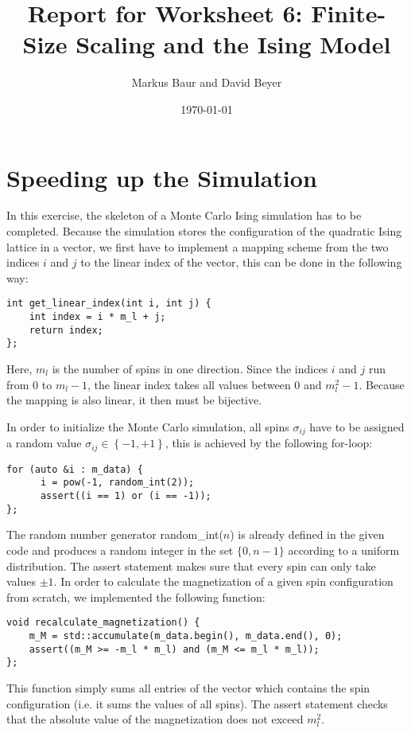 \documentclass[a4paper,10pt,bibtotoc]{scrartcl}
\begin{document}
\titlehead{Simulation Methods in Physics I \hfill WS 2019/2010}
\title{Report for Worksheet 6: Finite-Size Scaling and the Ising Model}
\author{Markus Baur and David Beyer}
\date{\today}
\maketitle

\tableofcontents

\section{Speeding up the Simulation}
In this exercise, the skeleton of a Monte Carlo Ising simulation has to be completed. 
Because the simulation stores the configuration of the quadratic Ising lattice in a vector, we first have to implement a mapping scheme from the two indices $i$ and $j$ to the linear index of the vector, this can be done in the following way:
\begin{lstlisting}
int get_linear_index(int i, int j) {
    int index = i * m_l + j;
    return index;
};
\end{lstlisting}
Here, $m_l$ is the number of spins in one direction. 
Since the indices $i$ and $j$ run from $0$ to $m_l-1$, the linear index takes all values between $0$ and $m_l^2 -1$. 
Because the mapping is also linear, it then must be bijective.

In order to initialize the Monte Carlo simulation, all spins $\sigma_{ij}$ have to be assigned a random value $\sigma_{ij}\in\left\{-1,+1\right\}$, this is achieved by the following for-loop:
\begin{lstlisting}
for (auto &i : m_data) {
      i = pow(-1, random_int(2));
      assert((i == 1) or (i == -1));
};
\end{lstlisting}
The random number generator random\_int($n$) is already defined in the given code and produces a random integer in the set $\{0,n-1\}$ according to a uniform distribution.
The assert statement makes sure that every spin can only take values $\pm 1$.
\newpage
\noindent In order to calculate the magnetization of a given spin configuration from scratch, we implemented the following function:
\begin{lstlisting}
void recalculate_magnetization() {
    m_M = std::accumulate(m_data.begin(), m_data.end(), 0);
    assert((m_M >= -m_l * m_l) and (m_M <= m_l * m_l));
};
\end{lstlisting}
This function simply sums all entries of the vector which contains the spin configuration (i.e. it sums the values of all spins). 
The assert statement checks that the absolute value of the magnetization does not exceed $m_l^2$.
\end{document}
